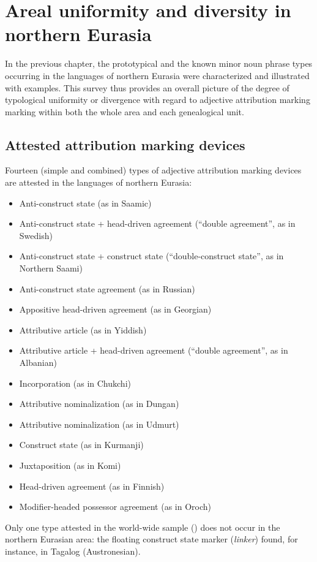 
\chapter[Areal uniformity and diversity]{Areal uniformity and diversity in northern Eurasia}\label{areality}
In the previous chapter, the prototypical and the known minor noun phrase types occurring in the languages of northern Eurasia were characterized and illustrated with examples. This survey thus provides an overall picture of the degree of typological uniformity or divergence with regard to adjective attribution marking marking within both the whole area and each genealogical unit.

\section{Attested attribution marking devices}
Fourteen (simple and combined) types of adjective attribution marking devices are attested in the languages of northern Eurasia:
\begin{itemize}
\item Anti-construct state (as in Saamic)
\item Anti-construct state + head-driven agreement (“double agreement”, as in Swedish)
\item Anti-construct state + construct state (“double-construct state”, as in Northern Saami)
\item Anti-construct state agreement (as in Russian)
\item Appositive head-driven agreement (as in Georgian)
\item Attributive article (as in Yiddish)
\item Attributive article + head-driven agreement (“double agreement”, as in Albanian)
\item Incorporation (as in Chukchi)
\item Attributive nominalization (as in Dungan)
\item Attributive nominalization (as in Udmurt)
\item Construct state (as in Kurmanji)
\item Juxtaposition (as in Komi)
\item Head-driven agreement (as in Finnish)
\item Modifier-headed possessor agreement (as in Oroch)
\end{itemize}
Only one type attested in the world-wide sample () does not occur in the northern Eurasian area: the floating construct state marker (\textit{linker}) found, for instance, in Tagalog (Austronesian). 

